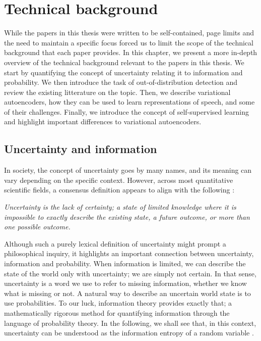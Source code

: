 

\chapter[technical background]{Technical background}\label{chp:technical-background}

While the papers in this thesis were written to be self-contained, page limits and the need to maintain a specific focus forced us to limit the scope of the technical background that each paper provides. In this chapter, we present a more in-depth overview of the technical background relevant to the papers in this thesis. 
We start by quantifying the concept of uncertainty relating it to information and probability. We then introduce the task of out-of-distribution detection and review the existing litterature on the topic. 
Then, we describe variational autoencoders, how they can be used to learn representations of speech, and some of their challenges. Finally, we introduce the concept of self-supervised learning and highlight important differences to variational autoencoders. 


\section{Uncertainty and information} \label{sec:uncertainty-information-theory}

In society, the concept of uncertainty goes by many names, and its meaning can vary depending on the specific context. However, across most quantitative scientific fields, a consensus definition appears to align with the following \parencite{hubbard_how_2014}:
%
\begin{center}
    \textit{Uncertainty is the lack of certainty; a state of limited knowledge where it is impossible to exactly describe the existing state, a future outcome, or more than one possible outcome.}
\end{center}
%
Although such a purely lexical definition of uncertainty might prompt a philosophical inquiry, it highlights an important connection between uncertainty, information and probability. When information is limited, we can describe the state of the world only with uncertainty; we are simply not certain. In that sense, uncertainty is a word we use to refer to missing information, whether we know what is missing or not. 
A natural way to describe an uncertain world state is to use probabilities. To our luck, information theory provides exactly that; a mathematically rigorous method for quantifying information through the language of probability theory. In the following, we shall see that, in this context, uncertainty can be understood as the information entropy of a random variable \parencite{mackay_information_2003}. 


